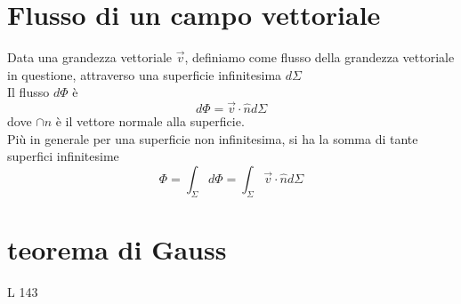 \documentclass[a4paper]{report}
\begin{document}
  \section{Flusso di un campo vettoriale}
  Data una grandezza vettoriale $\vec{v}$,  definiamo come flusso della grandezza vettoriale in questione, attraverso una superficie infinitesima $d \Sigma$\\
  Il flusso $d \Phi$ è
  \[ d \Phi = \vec{v}\cdot \hat{n} d \Sigma \]
  dove $\cap{n}$ è il vettore normale alla superficie.\\
  Più in generale per una superficie non infinitesima, si ha la somma di tante superfici infinitesime
  \[ \Phi = \int_\Sigma d\Phi = \int_\Sigma \vec{v} \cdot \hat{n} d\Sigma \]


  \section{teorema di Gauss}


L 143
\end{document}
